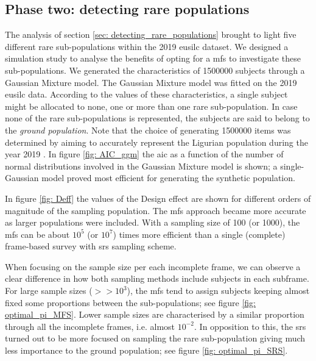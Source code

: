 \subsection{Phase two: detecting rare populations}\label{sec: sampling_rare_populations}
The analysis of section \ref{sec: detecting_rare_populations} brought to light five different rare sub-populations within the 2019 \gls{eusilc} dataset.
We designed a simulation study to analyse the benefits of opting for a \gls{mfs} to investigate these sub-populations.
We generated the characteristics of 1500000 subjects through a Gaussian Mixture model.
The Gaussian Mixture model was fitted on the 2019 \gls{eusilc} data.
According to the values of these characteristics, a single subject might be allocated to none, one or more than one rare sub-population.
In case none of the rare sub-populations is represented, the subjects are said to belong to the \emph{ground population}.
Note that the choice of generating 1500000 items was determined by aiming to accurately represent the Ligurian population during the year 2019 \cite[]{ISTAT:pop_liguria_2019}.
In figure \ref{fig: AIC_ggm} the \gls{aic} as a function of the number of normal distributions involved in the Gaussian Mixture model is shown; a single-Gaussian model proved most efficient for generating the synthetic population.

In figure \ref{fig: Deff} the values of the Design effect are shown for different orders of magnitude of the sampling population.
The \gls{mfs} approach became more accurate as larger populations were included.
With a sampling size of 100 (or 1000), the \gls{mfs} can be about $10^{5}$ (or $10^{7}$) times more efficient than a single (complete) frame-based survey with \gls{srs} sampling scheme. 

When focusing on the sample size per each incomplete frame, we can observe a clear difference in how both sampling methods include subjects in each subframe.
For large sample sizes ($>> 10^{3}$), the \gls{mfs} tend to assign subjects keeping almost fixed some proportions between the sub-populations; see figure \ref{fig: optimal_pi_MFS}.
Lower sample sizes are characterised by a similar proportion through all the incomplete frames, i.e. almost $10^{-2}.$
In opposition to this, the \gls{srs} turned out to be more focused on sampling the rare sub-population giving much less importance to the ground population; see figure \ref{fig: optimal_pi_SRS}.


